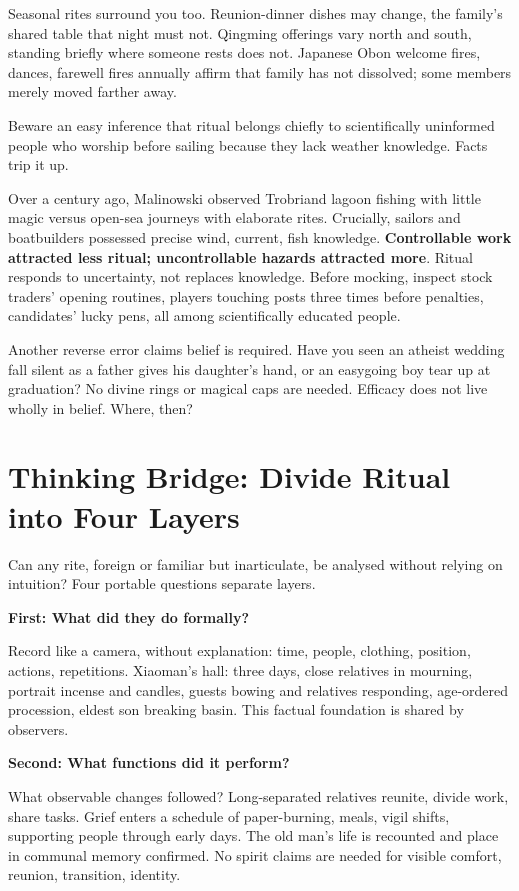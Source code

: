 Seasonal rites surround you too. Reunion-dinner dishes may change, the family's shared table that night must not. Qingming offerings vary north and south, standing briefly where someone rests does not. Japanese Obon welcome fires, dances, farewell fires annually affirm that family has not dissolved; some members merely moved farther away.

Beware an easy inference that ritual belongs chiefly to scientifically uninformed people who worship before sailing because they lack weather knowledge. Facts trip it up.

Over a century ago, Malinowski observed Trobriand lagoon fishing with little magic versus open-sea journeys with elaborate rites. Crucially, sailors and boatbuilders possessed precise wind, current, fish knowledge. \textbf{Controllable work attracted less ritual; uncontrollable hazards attracted more}. Ritual responds to uncertainty, not replaces knowledge. Before mocking, inspect stock traders' opening routines, players touching posts three times before penalties, candidates' lucky pens, all among scientifically educated people.

Another reverse error claims belief is required. Have you seen an atheist wedding fall silent as a father gives his daughter's hand, or an easygoing boy tear up at graduation? No divine rings or magical caps are needed. Efficacy does not live wholly in belief. Where, then?

\section[Thinking Bridge: Four Layers of Ritual]{Thinking Bridge: Divide Ritual into Four Layers}
Can any rite, foreign or familiar but inarticulate, be analysed without relying on intuition? Four portable questions separate layers.

\textbf{First: What did they do formally?}

Record like a camera, without explanation: time, people, clothing, position, actions, repetitions. Xiaoman's hall: three days, close relatives in mourning, portrait incense and candles, guests bowing and relatives responding, age-ordered procession, eldest son breaking basin. This factual foundation is shared by observers.

\textbf{Second: What functions did it perform?}

What observable changes followed? Long-separated relatives reunite, divide work, share tasks. Grief enters a schedule of paper-burning, meals, vigil shifts, supporting people through early days. The old man's life is recounted and place in communal memory confirmed. No spirit claims are needed for visible comfort, reunion, transition, identity.

